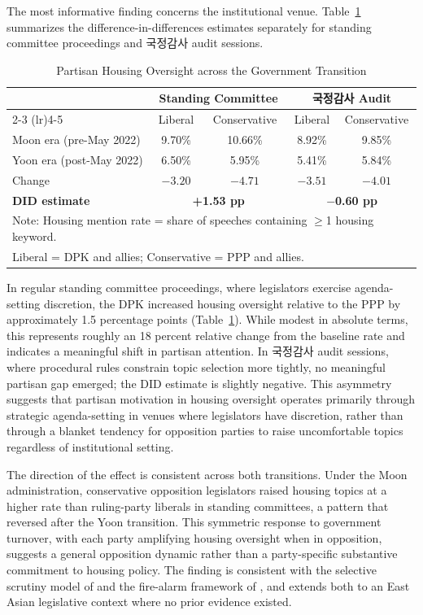 \documentclass[11pt]{article}
\begin{document}
The most informative finding concerns the institutional venue. Table~\ref{tab:oversight} summarizes the difference-in-differences estimates separately for standing committee proceedings and 국정감사 audit sessions.

\begin{table}[H]
\centering
\caption{Partisan Housing Oversight across the Government Transition}
\label{tab:oversight}
\begin{tabular}{lcc cc}
\toprule
 & \multicolumn{2}{c}{Standing Committee} & \multicolumn{2}{c}{국정감사 Audit} \\
\cmidrule(lr){2-3} \cmidrule(lr){4-5}
 & Liberal & Conservative & Liberal & Conservative \\
\midrule
Moon era (pre-May 2022) & 9.70\% & 10.66\% & 8.92\% & 9.85\% \\
Yoon era (post-May 2022) & 6.50\% & 5.95\% & 5.41\% & 5.84\% \\[3pt]
Change & $-3.20$ & $-4.71$ & $-3.51$ & $-4.01$ \\[3pt]
\textbf{DID estimate} & \multicolumn{2}{c}{\textbf{+1.53 pp}} & \multicolumn{2}{c}{\textbf{$-$0.60 pp}} \\
\bottomrule
\multicolumn{5}{l}{\footnotesize Note: Housing mention rate = share of speeches containing $\geq$1 housing keyword.} \\
\multicolumn{5}{l}{\footnotesize Liberal = DPK and allies; Conservative = PPP and allies.}
\end{tabular}
\end{table}

In regular standing committee proceedings, where legislators exercise agenda-setting discretion, the DPK increased housing oversight relative to the PPP by approximately 1.5 percentage points (Table~\ref{tab:oversight}). While modest in absolute terms, this represents roughly an 18 percent relative change from the baseline rate and indicates a meaningful shift in partisan attention. In 국정감사 audit sessions, where procedural rules constrain topic selection more tightly, no meaningful partisan gap emerged; the DID estimate is slightly negative. This asymmetry suggests that partisan motivation in housing oversight operates primarily through strategic agenda-setting in venues where legislators have discretion, rather than through a blanket tendency for opposition parties to raise uncomfortable topics regardless of institutional setting.

The direction of the effect is consistent across both transitions. Under the Moon administration, conservative opposition legislators raised housing topics at a higher rate than ruling-party liberals in standing committees, a pattern that reversed after the Yoon transition. This symmetric response to government turnover, with each party amplifying housing oversight when in opposition, suggests a general opposition dynamic rather than a party-specific substantive commitment to housing policy. The finding is consistent with the selective scrutiny model of \citet{senninger2016} and the fire-alarm framework of \citet{mccubbinsSchwartz1984}, and extends both to an East Asian legislative context where no prior evidence existed.
\end{document}
